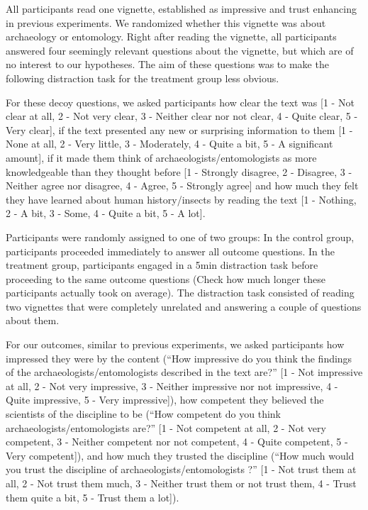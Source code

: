 \documentclass[
  english,
  doc,floatsintext]{apa6}
\begin{document}
All participants read one vignette, established as impressive and trust enhancing in previous experiments. We randomized whether this vignette was about archaeology or entomology. Right after reading the vignette, all participants answered four seemingly relevant questions about the vignette, but which are of no interest to our hypotheses. The aim of these questions was to make the following distraction task for the treatment group less obvious.

For these decoy questions, we asked participants how clear the text was {[}1 - Not clear at all, 2 - Not very clear, 3 - Neither clear nor not clear, 4 - Quite clear, 5 - Very clear{]}, if the text presented any new or surprising information to them {[}1 - None at all, 2 - Very little, 3 - Moderately, 4 - Quite a bit, 5 - A significant amount{]}, if it made them think of archaeologists/entomologists as more knowledgeable than they thought before {[}1 - Strongly disagree, 2 - Disagree, 3 - Neither agree nor disagree, 4 - Agree, 5 - Strongly agree{]} and how much they felt they have learned about human history/insects by reading the text {[}1 - Nothing, 2 - A bit, 3 - Some, 4 - Quite a bit, 5 - A lot{]}.

Participants were randomly assigned to one of two groups: In the control group, participants proceeded immediately to answer all outcome questions. In the treatment group, participants engaged in a 5min distraction task before proceeding to the same outcome questions (Check how much longer these participants actually took on average). The distraction task consisted of reading two vignettes that were completely unrelated and answering a couple of questions about them.

For our outcomes, similar to previous experiments, we asked participants how impressed they were by the content (``How impressive do you think the findings of the archaeologists/entomologists described in the text are?'' {[}1 - Not impressive at all, 2 - Not very impressive, 3 - Neither impressive nor not impressive, 4 - Quite impressive, 5 - Very impressive{]}), how competent they believed the scientists of the discipline to be (``How competent do you think archaeologists/entomologists are?'' {[}1 - Not competent at all, 2 - Not very competent, 3 - Neither competent nor not competent, 4 - Quite competent, 5 - Very competent{]}), and how much they trusted the discipline (``How much would you trust the discipline of archaeologists/entomologists ?'' {[}1 - Not trust them at all, 2 - Not trust them much, 3 - Neither trust them or not trust them, 4 - Trust them quite a bit, 5 - Trust them a lot{]}).
\end{document}
